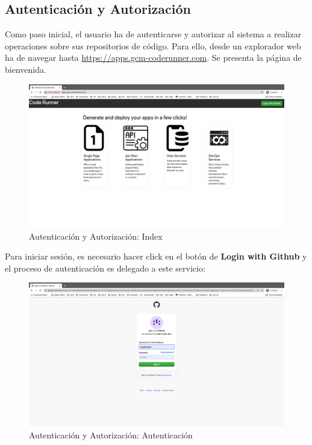 \documentclass[a4paper,11pt]{book}
\begin{document}
\subsection{Autenticación y Autorización}

Como paso inicial, el usuario ha de autenticarse y autorizar al sistema a realizar operaciones sobre sus repositorios de código. Para ello, desde un explorador web ha de navegar hasta \url{https://apps.gcm-coderunner.com}. Se presenta la página de bienvenida. 

\begin{figure}[H]
\centering
\includegraphics[scale=0.2]{imagenes/casouso/1.png}
\caption{  Autenticación y Autorización: Index }
\end{figure}

Para iniciar sesión, es necesario hacer click en el botón de \textbf{Login with Github} y el proceso de autenticación es delegado a este servicio:

\begin{figure}[H]
\centering
\includegraphics[scale=0.2]{imagenes/casouso/2.png}
\caption{  Autenticación y Autorización: Autenticación }
\end{figure}
\end{document}
